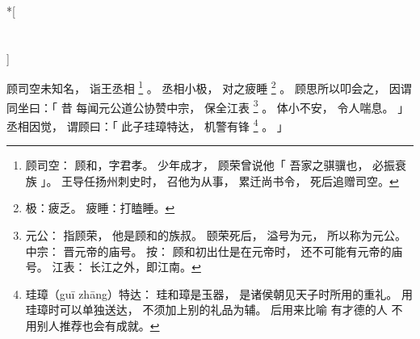 
\switchcolumn[0]*[\section{}]

顾司空未知名，
诣王丞相%
\footnote{%
    顾司空：
        顾和，字君孝。
        少年成才，
        顾荣曾说他「
            吾家之骐骥也，
            必振衰族
        」。
        王导任扬州刺史时，
        召他为从事，
        累迁尚书令，
        死后追赠司空。
}%
。
丞相小极，
对之疲睡%
\footnote{%
    极：疲乏。
    疲睡：打瞌睡。
}%
。
顾思所以叩会之，
因谓同坐曰：「
    昔
    每闻元公道公协赞中宗，
    保全江表%
    \footnote{%
        元公：
            指顾荣，
            他是顾和的族叔。
            颐荣死后，
            溢号为元，
            所以称为元公。
        中宗：
            晋元帝的庙号。
            按：
            顾和初出仕是在元帝时，
            还不可能有元帝的庙号。
        江表：
            长江之外，即江南。
    }%
    。
    体小不安，
    令人喘息。
」
丞相因觉，
谓顾曰：「
    此子珪璋特达，
    机警有锋%
    \footnote{%
        珪璋（guī zhāng）特达：
            珪和璋是玉器，
            是诸侯朝见天子时所用的重礼。
            用珪璋时可以单独送达，
            不须加上别的礼品为辅。
            后用来比喻
            有才德的人
            不用别人推荐也会有成就。
    }%
    。
」

\switchcolumn



